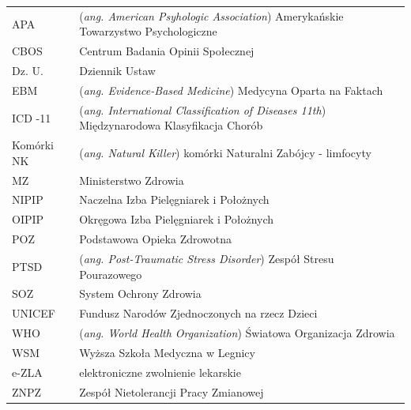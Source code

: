 \documentclass[a4paper,12pt,twoside,openright]{mwrep}
\begin{document}
\begin{table}[ht]
    
    \label{tab:index}
	\begin{tabular}{  l  l  }
	
    APA & (\textit{ang. American Psyhologic Association}) Amerykańskie Towarzystwo Psychologiczne \\
	
	CBOS & Centrum Badania Opinii Społecznej \\

	Dz. U. & Dziennik Ustaw \\

	EBM & (\textit{ang. Evidence-Based Medicine}) Medycyna Oparta na Faktach \\
	
	ICD -11& (\textit{ang. International Classification of Diseases 11th}) Międzynarodowa Klasyfikacja Chorób \\
	
	Komórki NK & (\textit{ang. Natural Killer}) komórki Naturalni Zabójcy - limfocyty \\

	MZ & Ministerstwo Zdrowia\\

	NIPIP & Naczelna Izba Pielęgniarek i Położnych\\

	OIPIP & Okręgowa Izba Pielęgniarek i Położnych\\

	POZ & Podstawowa Opieka Zdrowotna\\

	PTSD & (\textit{ang. Post-Traumatic Stress Disorder}) Zespół Stresu Pourazowego \\

	SOZ & System Ochrony Zdrowia\\
	
	UNICEF & Fundusz Narodów Zjednoczonych na rzecz Dzieci\\

	WHO & (\textit{ang. World Health Organization}) Światowa Organizacja Zdrowia \\
	
	WSM& Wyższa Szkoła Medyczna w Legnicy\\
     
     e-ZLA & elektroniczne zwolnienie lekarskie \\

	ZNPZ & Zespół Nietolerancji Pracy Zmianowej \\
	

	
	\end{tabular}
   

\end{table}
\end{document}
